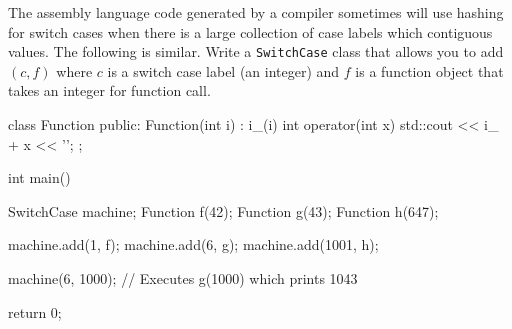 The assembly language code generated by a compiler sometimes will use
hashing for switch cases when there is a large collection of
case labels which contiguous values.
The following is similar.
Write a \verb!SwitchCase! class that allows you to add
$(c, f)$ where $c$ is a switch case label (an integer) and
$f$ is a function object that takes an integer for
function call.
\begin{console}
class Function
{
public:
    Function(int i) : i_(i) {}
    int operator(int x) { std::cout << i_ + x << '\n'; }
};

int main()
{
    SwitchCase machine;
    Function f(42);
    Function g(43);
    Function h(647);
    
    machine.add(1, f);
    machine.add(6, g);
    machine.add(1001, h);

    machine(6, 1000); // Executes g(1000) which prints 1043
    
    return 0;
}
\end{console}
